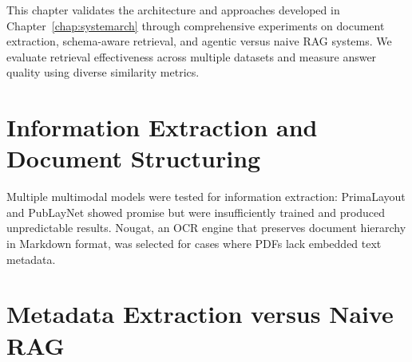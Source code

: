 \label{chap:results}

This chapter validates the architecture and approaches developed in Chapter~\ref{chap:systemarch} through comprehensive experiments on document extraction, schema-aware retrieval, and agentic versus naive \gls{RAG} systems. We evaluate retrieval effectiveness across multiple datasets and measure answer quality using diverse similarity metrics.

\section{Information Extraction and Document Structuring}

Multiple multimodal models were tested for information extraction: PrimaLayout and PubLayNet showed promise but were insufficiently trained and produced unpredictable results. Nougat, an OCR engine that preserves document hierarchy in Markdown format, was selected for cases where PDFs lack embedded text metadata.



\section{Metadata Extraction versus Naive RAG}
